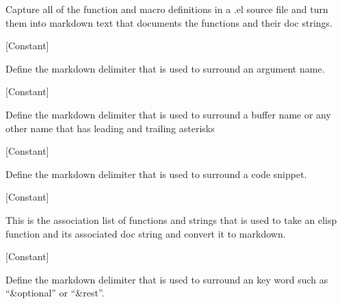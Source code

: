 \begin{doc-string}
Capture all of the function and macro definitions in a .el source file and turn
them into markdown text that documents the functions and their doc strings.
\end{doc-string}

\vspace{1em}
\noindent
{}
\usebox{\funcname}
 \hfill [Constant]

\begin{doc-string}
Define the markdown delimiter that is used to surround an argument name.
\end{doc-string}

\vspace{1em}
\noindent
{}
\usebox{\funcname}
 \hfill [Constant]

\begin{doc-string}
Define the markdown delimiter that is used to surround a buffer name or
any other name that has leading and trailing asterisks
\end{doc-string}

\vspace{1em}
\noindent
{}
\usebox{\funcname}
 \hfill [Constant]

\begin{doc-string}
Define the markdown delimiter that is used to surround a code snippet.
\end{doc-string}

\vspace{1em}
\noindent
{}
\usebox{\funcname}
 \hfill [Constant]

\begin{doc-string}
This is the association list of functions and strings that is used to take an elisp
function and its associated doc string and convert it to markdown.
\end{doc-string}

\vspace{1em}
\noindent
{}
\usebox{\funcname}
 \hfill [Constant]

\begin{doc-string}
Define the markdown delimiter that is used to surround an key word such as
``\&optional'' or ``\&rest''.
\end{doc-string}

